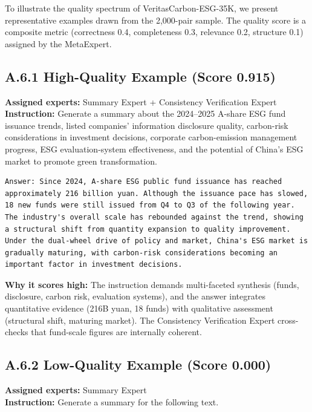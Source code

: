 To illustrate the quality spectrum of VeritasCarbon-ESG-35K, we present representative examples drawn from the 2,000-pair sample. The quality score is a composite metric (correctness 0.4, completeness 0.3, relevance 0.2, structure 0.1) assigned by the MetaExpert.

\subsection*{A.6.1 High-Quality Example (Score 0.915)}

\textbf{Assigned experts:} Summary Expert + Consistency Verification Expert\\
\textbf{Instruction:} Generate a summary about the 2024--2025 A-share ESG fund issuance trends, listed companies' information disclosure quality, carbon-risk considerations in investment decisions, corporate carbon-emission management progress, ESG evaluation-system effectiveness, and the potential of China's ESG market to promote green transformation.

\begin{lstlisting}[breaklines]
Answer: Since 2024, A-share ESG public fund issuance has reached approximately 216 billion yuan. Although the issuance pace has slowed, 18 new funds were still issued from Q4 to Q3 of the following year. The industry's overall scale has rebounded against the trend, showing a structural shift from quantity expansion to quality improvement. Under the dual-wheel drive of policy and market, China's ESG market is gradually maturing, with carbon-risk considerations becoming an important factor in investment decisions.
\end{lstlisting}

\noindent\textbf{Why it scores high:} The instruction demands multi-faceted synthesis (funds, disclosure, carbon risk, evaluation systems), and the answer integrates quantitative evidence (216B yuan, 18 funds) with qualitative assessment (structural shift, maturing market). The Consistency Verification Expert cross-checks that fund-scale figures are internally coherent.

\subsection*{A.6.2 Low-Quality Example (Score 0.000)}

\textbf{Assigned experts:} Summary Expert\\
\textbf{Instruction:} Generate a summary for the following text.

